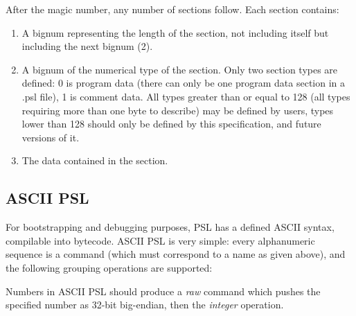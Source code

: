 After the magic number, any number of sections follow. Each section contains:

\begin{enumerate}
\item A bignum representing the length of the section, not including itself but including the next bignum (2).
\item A bignum of the numerical type of the section. Only two section types are defined: 0 is program data (there can only be one program data section in a .psl file), 1 is comment data. All types greater than or equal to 128 (all types requiring more than one byte to describe) may be defined by users, types lower than 128 should only be defined by this specification, and future versions of it.
\item The data contained in the section.
\end{enumerate}



\subsection{ASCII PSL}

For bootstrapping and debugging purposes, PSL has a defined ASCII syntax, compilable into bytecode. ASCII PSL is very simple: every alphanumeric sequence is a command (which must correspond to a name as given above), and the following grouping operations are supported:


Numbers in ASCII PSL should produce a \textit{raw} command which pushes the specified number as 32-bit big-endian, then the \textit{integer} operation.
